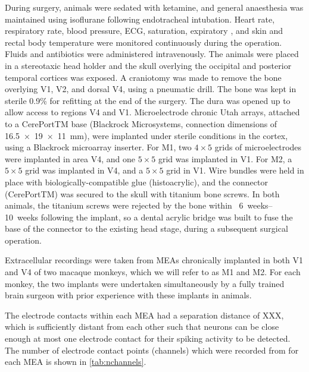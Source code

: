 During surgery, animals were sedated with ketamine, and general anaesthesia was maintained using isoflurane following endotracheal intubation.
Heart rate, respiratory rate, blood pressure, \ac{ECG},  saturation, expiratory , and skin and rectal body temperature were monitored continuously during the operation.
Fluids and antibiotics were administered intravenously.
The animals were placed in a stereotaxic head holder and the skull overlying the occipital and posterior temporal cortices was exposed.
A craniotomy was made to remove the bone overlying \ac{V1}, V2, and dorsal \ac{V4}, using a pneumatic drill.
The bone was kept in sterile 0.9\%  for refitting at the end of the surgery.
The dura was opened up to allow access to regions \ac{V4} and \ac{V1}.
Microelectrode chronic Utah arrays, attached to a CerePortTM base (Blackrock Microsystems, connection dimensions of \SI{16.5 x 19 x 11}{\milli\metre}), were implanted under sterile conditions in the cortex, using a Blackrock microarray inserter.
For \ac{M1}, two $4{\times}5$ grids of microelectrodes were implanted in area \ac{V4}, and one $5{\times}5$ grid was implanted in \ac{V1}.
For \ac{M2}, a $5{\times}5$ grid was implanted in \ac{V4}, and a $5{\times}5$ grid in \ac{V1}.
Wire bundles were held in place with biologically-compatible glue (histoacrylic), and the connector (CerePortTM) was secured to the skull with titanium bone screws.
In both animals, the titanium screws were rejected by the bone within ~\SIrange{6}{10}{weeks} following the implant, so a dental acrylic bridge was built to fuse the base of the connector to the existing head stage, during a subsequent surgical operation.



Extracellular recordings were taken from \acp{MEA} chronically implanted in both \ac{V1} and \ac{V4} of two macaque monkeys, which we will refer to as \ac{M1} and \ac{M2}.
For each monkey, the two implants were undertaken simultaneously by a fully trained brain surgeon with prior experience with these implants in animals.

The electrode contacts within each \ac{MEA} had a separation distance of XXX,%
which is sufficiently distant from each other such that neurons can be close enough at most one electrode contact for their spiking activity to be detected.%
The number of electrode contact points (channels) which were recorded from for each \ac{MEA} is shown in \autoref{tab:nchannels}.

